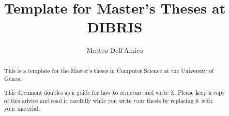 \documentclass{masterthesis}
\begin{document}
\title{Template for Master's Theses at DIBRIS}

\author{Matteo Dell'Amico}



\maketitle

\begin{abstract}
This is a template for the Master's thesis in Computer Science at the University of Genoa.

This document doubles as a guide for how to structure and write it. Please keep a copy of this advice and read it carefully while you write your thesis by replacing it with your material.
\end{abstract}

\tableofcontents













\printbibliography
% 
% 
\end{document}
